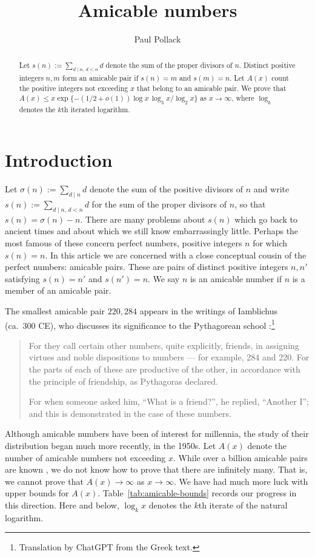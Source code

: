 \documentclass[11pt]{amsart}
\title{Amicable numbers}
\author{Paul Pollack}
\begin{document}
    \begin{abstract} Let $s(n):=\sum_{d\mid n,\,d < n} d$ denote the sum of the proper divisors of $n$. Distinct positive integers $n,m$ form an \textsf{amicable pair} if  $s(n)=m$ and $s(m)=n$. 
Let $A(x)$ count the positive integers not exceeding $x$
that belong to an amicable pair.
We prove that
$A(x)\le x\exp\{-(1/2+o(1))\log x\,\log_3 x/\log_2 x\}$
as $x\to\infty$, where $\log_k$ denotes the $k$th iterated logarithm.
\end{abstract}
    \maketitle
    
    \section{Introduction}\label{sec:introduction}

Let $\sigma(n):=\sum_{d\mid n}d$ denote the sum of the positive divisors of $n$ and write $s(n):=\sum_{d\mid n,\,d<n}d$ for the sum of the proper divisors of $n$, so that $s(n)=\sigma(n)-n$. There are many problems about $s(n)$ which go back to ancient times and about which we still know embarrassingly little. Perhaps the most famous of these concern \textsf{perfect numbers}, positive integers $n$ for which $s(n)=n$. In this article we are concerned with a close conceptual cousin of the perfect numbers: amicable pairs. These are pairs of distinct positive integers \(n,n'\) satisfying \(s(n)=n'\) and \(s(n')=n\). We say $n$ is an \textsf{amicable number} if $n$ is a member of an amicable pair. 

The smallest amicable pair $220, 284$ appears in the writings of Iamblichus (ca.~300 CE), who discusses its significance to the Pythagorean school \cite[pp.~34--35]{Iamblichus1894}:\footnote{Translation by ChatGPT from the Greek text.}
\begin{quote}
    For they call certain other numbers, quite explicitly, friends, in assigning virtues and noble dispositions to numbers --- for example, 284 and 220. For the parts of each of these are productive of the other, in accordance with the principle of friendship, as Pythagoras declared.

For when someone asked him, “What is a friend?”, he replied, “Another I”; and this is demonstrated in the case of these numbers.
\end{quote}

Although amicable numbers have been of interest for millennia, the study of their distribution began much more recently, in the 1950s. Let $A(x)$ denote the number of amicable numbers not exceeding $x$. While over a billion amicable pairs are known \cite{ChernykhDatabase}, we do not know how to prove that there are infinitely many. That is, we cannot prove that $A(x)\to\infty$ as $x\to\infty$. We have had much more luck with upper bounds for $A(x)$. Table~\ref{tab:amicable-bounds} records our progress in this direction. Here and below, $\log_{k} x$ denotes the $k$th iterate of the natural logarithm.
\end{document}
